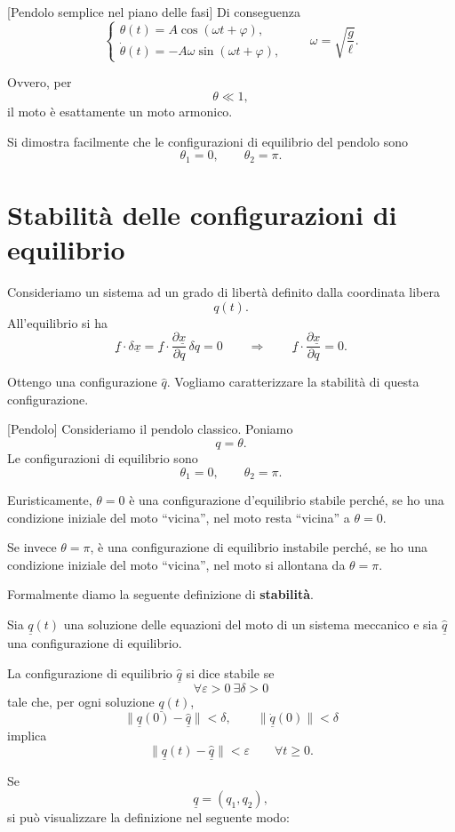 \begin{example}{}[Pendolo semplice nel piano delle fasi]
Di conseguenza
\[
\left\{
\begin{array}{l}
\theta(t)=A\cos(\omega t+\varphi),\\[1mm]
\dot{\theta}(t)=-A\omega\sin(\omega t+\varphi),
\end{array}
\right.
\qquad
\omega=\sqrt{\dfrac{g}{\ell}}.
\]

Ovvero, per
\[
\theta\ll 1,
\]
il moto è esattamente un moto armonico.

Si dimostra facilmente che le configurazioni di equilibrio del pendolo sono
\[
\theta_1=0,
\qquad
\theta_2=\pi.
\]
\end{example}



\section{Stabilità delle configurazioni di equilibrio}

Consideriamo un sistema ad un grado di libertà definito dalla coordinata libera
\[
q(t).
\]
All'equilibrio si ha
\[
\underline{f}\cdot \delta\underline{x}
=
\underline{f}\cdot
\frac{\partial \underline{x}}{\partial q}\,\delta q
=
0
\qquad \Longrightarrow \qquad
\underline{f}\cdot
\frac{\partial \underline{x}}{\partial q}
=
0.
\]

Ottengo una configurazione \(\hat{q}\). Vogliamo caratterizzare la
stabilità di questa configurazione.

\begin{example}{}[Pendolo]
Consideriamo il pendolo classico. Poniamo
\[
q=\theta.
\]
Le configurazioni di equilibrio sono
\[
\theta_1=0,
\qquad
\theta_2=\pi.
\]


Euristicamente, \(\theta=0\) è una configurazione d'equilibrio stabile perché,
se ho una condizione iniziale del moto ``vicina'', nel moto resta ``vicina'' a
\(\theta=0\).

Se invece \(\theta=\pi\), è una configurazione di equilibrio instabile perché,
se ho una condizione iniziale del moto ``vicina'', nel moto si allontana da
\(\theta=\pi\).
\end{example}
\inizioapprof
Formalmente diamo la seguente definizione di \textbf{stabilità}.
\begin{definition}{}
Sia $\underline{q}(t)$ una soluzione delle equazioni del moto di un sistema
meccanico e sia $\hat{\underline{q}}$ una configurazione di equilibrio.

La configurazione di equilibrio $\hat{\underline{q}}$ si dice stabile se
\[
\forall \varepsilon>0\ \exists \delta>0
\]
tale che, per ogni soluzione $\underline{q}(t)$,
\[
\|\underline{q}(0)-\hat{\underline{q}}\|<\delta,
\qquad
\|\dot{\underline{q}}(0)\|<\delta
\]
implica
\[
\|\underline{q}(t)-\hat{\underline{q}}\|<\varepsilon
\qquad \forall t\ge 0.
\]
\end{definition}
\fineapprof
Se
\[
\underline{q}=(q_1,q_2),
\]
si può visualizzare la definizione nel seguente modo:

